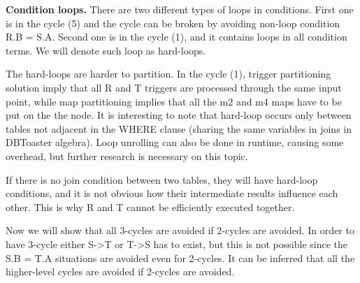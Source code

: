 \documentclass{sig-semester}
\begin{document}
\textbf{Condition loops.} There are two different types of loops in conditions. First one is in the cycle (5) and the cycle can be broken by avoiding non-loop condition R.B = S.A. Second one is in the cycle (1), and it contains loops in all condition terms. We will denote such loop as hard-loops.

The hard-loops are harder to partition. In the cycle (1), trigger partitioning solution imply that all R and T triggers are processed through the same input point, while map partitioning implies that all the m2 and m4 maps have to be put on the the node. It is interesting to note that hard-loop occurs only between tables not adjacent in the WHERE clause (sharing the same variables in joins in DBToaster algebra). Loop unrolling can also be done in runtime, causing some overhead, but further research is necessary on this topic.

If there is no join condition between two tables, they will have hard-loop conditions, and it is not obvious how their intermediate results influence each other. This is why R and T cannot be efficiently executed together.

Now we will show that all 3-cycles are avoided if 2-cycles are avoided. In order to have 3-cycle either S->T or T->S has to exist, but this is not possible since the S.B = T.A situations are avoided even for 2-cycles. It can be inferred that all the higher-level cycles are avoided if 2-cycles are avoided.
\end{document}
